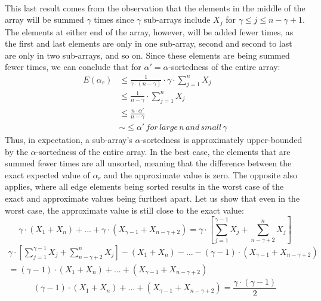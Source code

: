 \documentclass{article}
\begin{document}
\paragraph{}This last result comes from the observation that the elements in the middle of the array will be summed $\gamma$ times since $\gamma$ sub-arrays include $X_{j}$ for $\gamma \leq j \leq n - \gamma + 1$. 
The elements at either end of the array, however, will be added fewer times, as the first and last elements are only in one sub-array, second and second to last are only in two sub-arrays, and so on. Since these elements are being summed fewer times, we can conclude that for $\alpha'=\alpha$-sortedness of the entire array:
\begin{align*}
E(\alpha_{r}) & \leq \frac{1}{\gamma \cdot (n - \gamma)} \cdot \gamma \cdot \sum_{j = 1}^{n} X_{j} \\
& \leq \frac{1}{n - \gamma} \cdot \sum_{j = 1}^{n} X_{j} \\
& \leq \frac{n \cdot \alpha'}{n - \gamma} \\
& \sim\leq \alpha' \, for\, large\, n \, and\, small\, \gamma
\end{align*}
Thus, in expectation, a sub-array's $\alpha$-sortedness is approximately upper-bounded by the $\alpha$-sortedness of the entire array. In the best case, the elements that are summed fewer times are all unsorted, meaning that the difference between the exact expected value of $\alpha_{r}$ and the approximate value is zero.
The opposite also applies, where all edge elements being sorted results in the worst case of the exact and approximate values being furthest apart. Let us show that even in the worst case, the approximate value is still close to the exact value:
\begin{equation*}
\gamma \cdot (X_{1} + X_{n}) + ... + \gamma \cdot (X_{\gamma - 1} + X_{n - \gamma + 2}) = \gamma \cdot \left[ \sum_{j = 1}^{\gamma - 1} X_{j} + \sum_{n - \gamma + 2}^{n} X_{j}  \right]
\end{equation*}
\begin{multline*}
\gamma \cdot \left[ \sum_{j = 1}^{\gamma - 1} X_{j} + \sum_{n - \gamma + 2}^{n} X_{j}  \right] - (X_{1} + X_{n}) - ... - (\gamma - 1) \cdot (X_{\gamma - 1} + X_{n - \gamma + 2}) \\
= (\gamma - 1) \cdot (X_{1} + X_{n}) + ... + (X_{\gamma - 1} + X_{n - \gamma + 2})
\end{multline*}
\begin{equation*}
(\gamma - 1) \cdot (X_{1} + X_{n}) + ... + (X_{\gamma - 1} + X_{n - \gamma + 2}) = \frac{\gamma \cdot (\gamma - 1)}{2}
\end{equation*}
\end{document}

